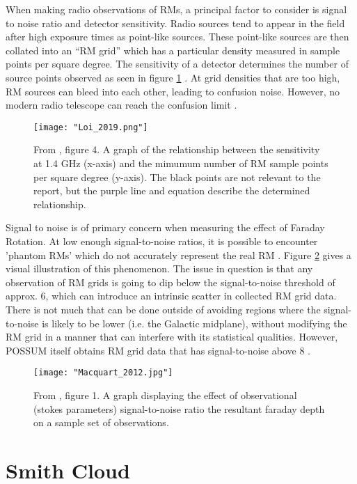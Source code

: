 When making radio observations of RMs, a principal factor to consider is signal to noise ratio and detector sensitivity. Radio sources tend to appear in the field after high exposure times as point-like sources. These point-like sources are then collated into an “RM grid” which has a particular density measured in sample points per square degree. The sensitivity of a detector determines the number of source points observed as seen in figure \ref{fig:loi} \citep{ID59}. At grid densities that are too high, RM sources can bleed into each other, leading to confusion noise. However, no modern radio telescope can reach the confusion limit \citep{ID59}.

\begin{figure}
    \texttt{[image: "Loi\_2019.png"]}
    \centering
    \caption{From \cite{ID59}, figure 4. A graph of the relationship between the sensitivity at 1.4 GHz (x-axis) and the mimumum number of RM sample points per square degree (y-axis). The black points are not relevant to the report, but the purple line and equation describe the determined relationship.}
    \label{fig:loi}
\end{figure}

Signal to noise is of primary concern when measuring the effect of Faraday Rotation. At low enough signal-to-noise ratios, it is possible to encounter 'phantom RMs' which do not accurately represent the real RM \citep{ID60}. Figure \ref{fig:snr} gives a visual illustration of this phenomenon. The issue in question is that any observation of RM grids is going to dip below the signal-to-noise threshold of approx. 6, which can introduce an intrinsic scatter in collected RM grid data. There is not much that can be done outside of avoiding regions where the signal-to-noise is likely to be lower (i.e. the Galactic midplane), without modifying the RM grid in a manner that can interfere with its statistical qualities. However, POSSUM itself obtains RM grid data that has signal-to-noise above 8 \citep{ID71}.

\begin{figure}
    \texttt{[image: "Macquart\_2012.jpg"]}
    \centering
    \caption{From \cite{ID60}, figure 1. A graph displaying the effect of observational (stokes parameters) signal-to-noise ratio the resultant faraday depth on a sample set of observations.}
    \label{fig:snr}
\end{figure}

\section{Smith Cloud}
\label{sec:sc}

